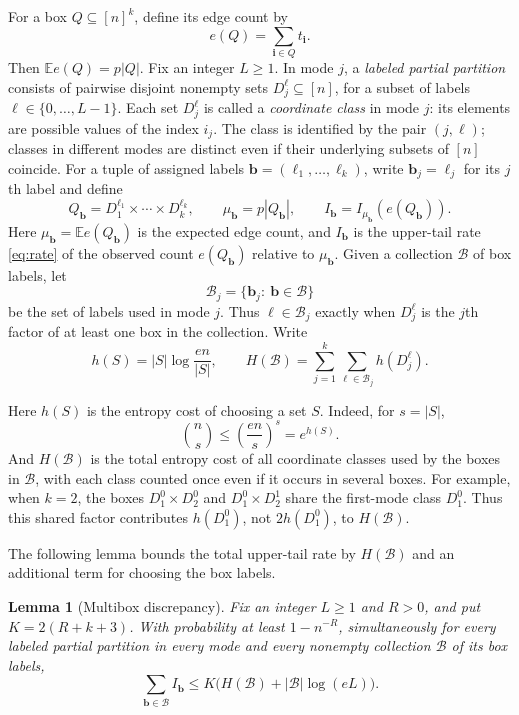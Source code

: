 \documentclass[11pt,reqno]{amsart}
\numberwithin{equation}{section}
\newtheorem{lemma}[theorem]{Lemma}
\theoremstyle{definition}
\theoremstyle{remark}
\newcommand{\E}{\mathbb E}
\begin{document}
For a box $Q\subseteq[n]^k$, define its edge count by
\begin{equation}\label{eq:edge-count}
 e(Q)=\sum_{\mathbf i\in Q}t_{\mathbf i}.
\end{equation}
Then $\E e(Q)=p|Q|$.
Fix an integer $L\ge1$. In mode $j$, a
\emph{labeled partial partition} consists of pairwise disjoint nonempty
sets $D_j^\ell\subseteq[n]$, for a subset of labels
$\ell\in\{0,\ldots,L-1\}$. 
Each set $D_j^\ell$ is called a \emph{coordinate class} in mode $j$:
its elements are possible values of the index $i_j$.
The class is identified by the pair $(j,\ell)$; classes in different
modes are distinct even if their underlying subsets of $[n]$ coincide.
For a tuple of assigned labels $\mathbf{b}=(\ell_1,\ldots,\ell_k)$,
write $\mathbf{b}_j=\ell_j$ for its $j$th label and define
\[
 Q_{\mathbf{b}}=D_1^{\ell_1}\times\cdots\times D_k^{\ell_k},\qquad
 \mu_{\mathbf{b}}=p|Q_{\mathbf{b}}|,\qquad
 I_{\mathbf{b}}=I_{\mu_{\mathbf{b}}}(e(Q_{\mathbf{b}})).
\]
Here $\mu_{\mathbf{b}}=\E e(Q_{\mathbf{b}})$ is the expected edge count,
and $I_{\mathbf{b}}$ is the upper-tail rate \eqref{eq:rate} of the observed
count $e(Q_{\mathbf{b}})$ relative to $\mu_{\mathbf{b}}$.
Given a collection $\mathcal B$ of box labels, let
\[
 \mathcal B_j=\{\mathbf{b}_j:\ \mathbf{b}\in\mathcal B\}
\]
be the set of labels used in mode $j$. Thus $\ell\in\mathcal B_j$
exactly when $D_j^\ell$ is the $j$th factor of at least one box
in the collection. Write
\[
 h(S)=|S|\log\frac{en}{|S|},\qquad
H(\mathcal B)=\sum_{j=1}^k\sum_{\ell\in\mathcal B_j}h(D_j^\ell).
\]


Here $h(S)$ is the entropy cost of choosing a set $S$. Indeed, for $s=|S|$,
\[
 \binom ns\le\left(\frac{en}{s}\right)^s=e^{h(S)}.
\]
And
$H(\mathcal B)$ is the total entropy cost of all coordinate classes
used by the boxes in $\mathcal B$, with each class counted once even
if it occurs in several boxes. For example, when $k=2$, the boxes $D_1^0\times D_2^0$ and
$D_1^0\times D_2^1$ share the first-mode class $D_1^0$.
Thus this shared factor contributes $h(D_1^0)$, not $2h(D_1^0)$,
to $H(\mathcal B)$.


The following lemma bounds the total upper-tail rate by
$H(\mathcal B)$ and an additional term for choosing the box labels.

\begin{lemma}[Multibox discrepancy]\label{lem:local}
Fix an integer $L\ge1$ and $R>0$, and put $K=2(R+k+3)$.
With probability at least
$1-n^{-R}$, simultaneously for every labeled partial partition in every
mode and every nonempty collection $\mathcal B$ of its box labels,
\begin{equation}\label{eq:local-budget}
 \sum_{\mathbf{b}\in\mathcal B}I_{\mathbf{b}}
 \le K\bigl(H(\mathcal B)+|\mathcal B|\log(eL)\bigr).
\end{equation}
\end{lemma}
\end{document}
